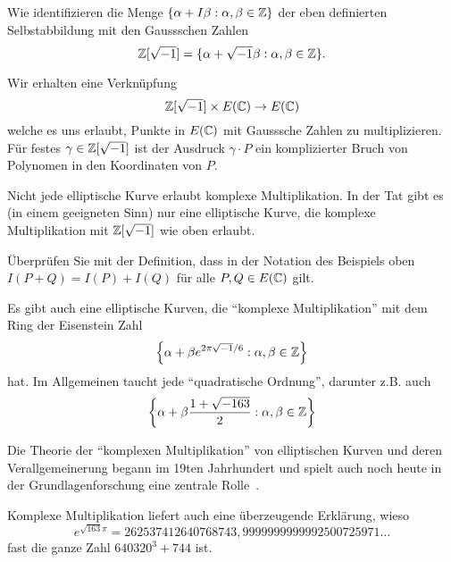 \begin{beispiel}
  Wie identifizieren die Menge $\{\alpha + I\beta :
  \alpha,\beta\in{\mathbb{Z}}\}$ der eben definierten Selbstabbildung mit den
  Gaussschen Zahlen
  \begin{equation*}
    {\mathbb{Z}}[\sqrt{-1}] = \{\alpha + \sqrt{-1}\beta : \alpha,\beta\in{\mathbb{Z}}\}.
  \end{equation*}

  Wir erhalten eine Verknüpfung
  \begin{equation*}
    {\mathbb{Z}}[\sqrt{-1}]\times E({\mathbb{C}})\rightarrow E({\mathbb{C}})
  \end{equation*}
  welche es uns erlaubt, Punkte in $E({\mathbb{C}})$ mit Gausssche Zahlen zu
  multiplizieren. Für festes $\gamma\in{\mathbb{Z}}[\sqrt{-1}]$ ist der
  Ausdruck $\gamma\cdot P$ ein komplizierter Bruch von Polynomen in
  den Koordinaten von $P$.

  Nicht jede elliptische Kurve erlaubt komplexe Multiplikation. In der
  Tat gibt es (in einem geeigneten Sinn) nur eine elliptische Kurve,
  die komplexe Multiplikation mit ${\mathbb{Z}}[\sqrt{-1}]$ wie oben erlaubt.
\end{beispiel}

\begin{aufgabe}
  Überprüfen Sie mit der Definition, dass in der Notation des
  Beispiels oben $I(P+Q) = I(P)+I(Q)$ für alle $P,Q\in E({\mathbb{C}})$ gilt.
\end{aufgabe}

Es gibt auch eine elliptische Kurven, die ``komplexe Multiplikation'' mit
dem Ring der Eisenstein Zahl
\begin{equation*}
  \left\{\alpha +\beta e^{2\pi\sqrt{-1}/6} : \alpha,\beta\in{\mathbb{Z}}\right\}
\end{equation*}
hat. Im Allgemeinen taucht jede ``quadratische Ordnung'', darunter
z.B. auch
\begin{equation*}
  \left\{\alpha +\beta \frac{1+\sqrt{-163}}{2} : \alpha,\beta\in{\mathbb{Z}}\right\}
\end{equation*}

Die Theorie der ``komplexen Multiplikation'' von elliptischen Kurven und deren
Verallgemeinerung begann im 19ten Jahrhundert und spielt auch noch
heute in der Grundlagenforschung eine zentrale Rolle~\cite{quanta:ao}.

Komplexe Multiplikation liefert auch eine überzeugende Erklärung,
wieso  
\begin{equation*}
  e^{\sqrt{163}\pi} = 262537412640768743,9999999999992500725971\ldots
\end{equation*}
fast die ganze Zahl  $640320^3 + 744$ ist.

